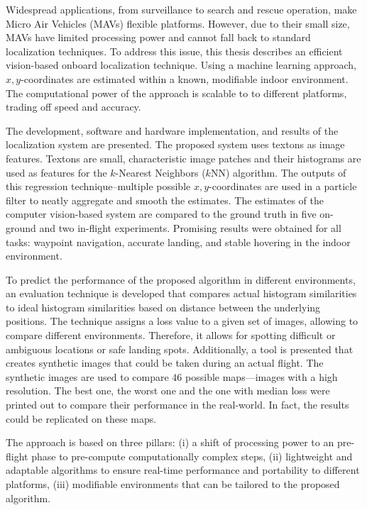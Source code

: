 Widespread applications, from surveillance to search and rescue operation, make Micro Air Vehicles (MAVs) flexible platforms.
However, due to their small size, MAVs have limited processing power and cannot
fall back to standard localization techniques. To address this
issue, this thesis describes an efficient vision-based onboard localization
technique. Using a machine
learning approach, $x,y$-coordinates are estimated within a known, modifiable indoor
environment. The computational power of the approach is scalable to to different platforms, trading off speed and accuracy.

The development, software and hardware
implementation, and results of the localization system are presented. The proposed system uses 
textons as image features. Textons are small, characteristic image patches and their histograms are used as features for the $k$-Nearest Neighbors ($k$NN)
algorithm. The outputs of this regression technique--multiple possible
$x, y$-coordinates are used in a particle filter to neatly aggregate
and smooth the estimates. The estimates of the computer vision-based
system are compared to the ground truth in five on-ground and two
in-flight experiments. Promising results were obtained for all tasks:
waypoint navigation, accurate landing, and stable hovering in the
indoor environment.

To predict the performance of the proposed algorithm in different environments, an evaluation
technique is developed that compares actual histogram similarities to
ideal histogram similarities based on distance between the underlying
positions. The technique assigns a loss value to a given set of
images, allowing to compare different environments. Therefore, it
allows for spotting difficult or ambiguous locations or safe landing
spots. Additionally, a tool is presented that creates synthetic images
that could be taken during an actual flight. The synthetic images are
used to compare 46 possible maps---images with a high resolution. The
best one, the worst one and the one with median loss were printed out
to compare their performance in the real-world. In fact, the results
could be replicated on these maps.

The approach is based on three pillars: (i) a shift of processing power to an pre-flight phase to pre-compute
computationally complex steps, (ii) lightweight and adaptable algorithms to ensure real-time performance and portability to different platforms,
(iii) modifiable environments that can be tailored to the proposed algorithm. 